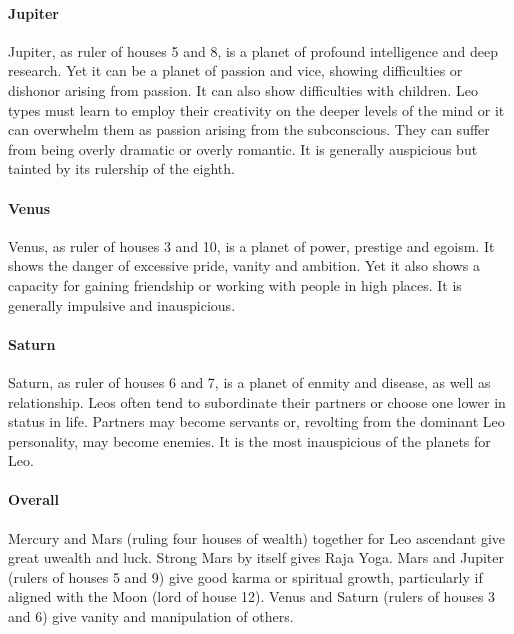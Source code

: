  

\paragraph{Jupiter}

Jupiter, as ruler of houses 5 and 8, is a planet of profound intelligence and deep research. Yet it can be a planet of passion and vice, showing difficulties or dishonor arising from passion. It can also show difficulties with children. Leo types must learn to employ their creativity on the deeper levels of the mind or it can overwhelm them as passion arising from the subconscious. They can suffer from being overly dramatic or overly romantic. It is generally auspicious but tainted by its rulership of the eighth.

 

\paragraph{Venus}

Venus, as ruler of houses 3 and 10, is a planet of power, prestige and egoism. It shows the danger of excessive pride, vanity and ambition. Yet it also shows a capacity for gaining friendship or working with people in high places. It is generally impulsive and inauspicious.

 

\paragraph{Saturn}

Saturn, as ruler of houses 6 and 7, is a planet of enmity and disease, as well as relationship. Leos often tend to subordinate their partners or choose one lower in status in life. Partners may become servants or, revolting from the dominant Leo personality, may become enemies. It is the most inauspicious of the planets for Leo.

 

\paragraph{Overall}

Mercury and Mars (ruling four houses of wealth) together for Leo ascendant give great uwealth and luck. Strong Mars by itself gives Raja Yoga. Mars and Jupiter (rulers of houses 5 and 9) give good karma or spiritual growth, particularly if aligned with the Moon (lord of house 12). Venus and Saturn (rulers of houses 3 and 6) give vanity and manipulation of others.

